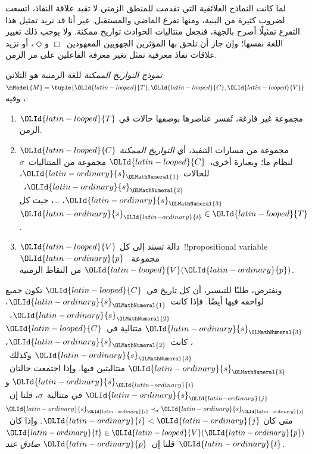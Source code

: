 \documentclass[../../../include/open-logic-section]{subfiles}
\begin{document}


لما كانت النماذج العلائقية التي تقدمت للمنطق الزمني لا تقيد علاقة النفاذ،
اتسعت لضروب كثيرة من البنية، ومنها تفرع الماضي والمستقبل. غير أنا قد نريد
تمثيل هذا التفرع تمثيلًا أصرح بالجهة، فنجعل متتاليات الحوادث تواريخ ممكنة.
ولا يوجب ذلك تغيير اللغة نفسها؛ وإن جاز أن نلحق بها المؤثرين الجهويين
المعهودين~$\Box$ و$\Diamond$، أو نزيد علاقات نفاذ معرفية تمثل تغير معرفة
الفاعلين على مر الزمن.

\begin{defn}
  \emph{نموذج التواريخ الممكنة} للغة الزمنية هو الثلاثي
  $\mModel{M}=\tuple{{\OLId{latin-looped}{T}},{\OLId{latin-looped}{C}},{\OLId{latin-looped}{V}}}$، وفيه:
  \begin{enumerate}
    \item ${\OLId{latin-looped}{T}}$ مجموعة غير فارغة، تُفسر عناصرها بوصفها حالات في الزمن.
    \item ${\OLId{latin-looped}{C}}$ مجموعة من مسارات التنفيذ، أي \emph{التواريخ الممكنة}
      لنظام ما؛ وبعبارة أخرى،~${\OLId{latin-looped}{C}}$ مجموعة من المتتاليات~$\sigma$ للحالات
      ${\OLId{latin-ordinary}{s}}_{\OLMathNumeral{1}}$، ${\OLId{latin-ordinary}{s}}_{\OLMathNumeral{2}}$،~${\OLId{latin-ordinary}{s}}_{\OLMathNumeral{3}}$، \dots، حيث كل~${\OLId{latin-ordinary}{s}}_{\OLId{latin-ordinary}{i}} \in {\OLId{latin-looped}{T}}$.
    \item ${\OLId{latin-looped}{V}}$ دالة تسند إلى كل~!!{propositional
      variable}~${\OLId{latin-ordinary}{p}}$ مجموعة~${\OLId{latin-looped}{V}}({\OLId{latin-ordinary}{p}})$ من النقاط الزمنية.
  \end{enumerate}
  ونفترض، طلبًا للتيسير، أن كل تاريخ في~${\OLId{latin-looped}{C}}$ تكون جميع لواحقه فيها أيضًا.
  فإذا كانت~${\OLId{latin-ordinary}{s}}_{\OLMathNumeral{1}}$، ${\OLId{latin-ordinary}{s}}_{\OLMathNumeral{2}}$،~${\OLId{latin-ordinary}{s}}_{\OLMathNumeral{3}}$ متتالية في~${\OLId{latin-looped}{C}}$، كانت~${\OLId{latin-ordinary}{s}}_{\OLMathNumeral{2}}$، ${\OLId{latin-ordinary}{s}}_{\OLMathNumeral{3}}$
  وكذلك~${\OLId{latin-ordinary}{s}}_{\OLMathNumeral{3}}$ متتاليتين فيها. وإذا اجتمعت حالتان~${\OLId{latin-ordinary}{s}}_{\OLId{latin-ordinary}{i}}$ و${\OLId{latin-ordinary}{s}}_{\OLId{latin-ordinary}{j}}$ في
  متتالية~$\sigma$، قلنا إن~${\OLId{latin-ordinary}{s}}_{\OLId{latin-ordinary}{i}} \prec_\sigma {\OLId{latin-ordinary}{s}}_{\OLId{latin-ordinary}{j}}$ متى كان ${\OLId{latin-ordinary}{i}}<{\OLId{latin-ordinary}{j}}$.
  وإذا كان~${\OLId{latin-ordinary}{t}} \in {\OLId{latin-looped}{V}}({\OLId{latin-ordinary}{p}})$ قلنا إن~${\OLId{latin-ordinary}{p}}$ \emph{صادق عند}~${\OLId{latin-ordinary}{t}}$.
\end{defn}
\end{document}
